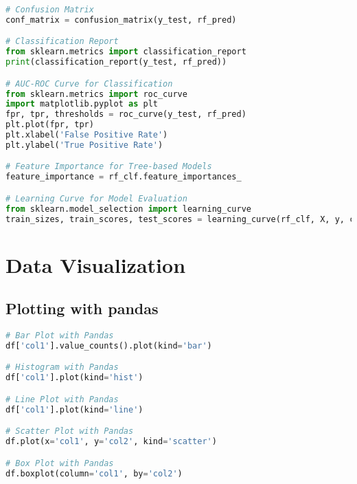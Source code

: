 \documentclass[english, threecolumn]{latex4ei/latex4ei_sheet}
\begin{document}
\begin{sectionbox}
\begin{lstlisting}[language=Python, gobble=0]
# Confusion Matrix
conf_matrix = confusion_matrix(y_test, rf_pred)

# Classification Report
from sklearn.metrics import classification_report
print(classification_report(y_test, rf_pred))

# AUC-ROC Curve for Classification
from sklearn.metrics import roc_curve
import matplotlib.pyplot as plt
fpr, tpr, thresholds = roc_curve(y_test, rf_pred)
plt.plot(fpr, tpr)
plt.xlabel('False Positive Rate')
plt.ylabel('True Positive Rate')

# Feature Importance for Tree-based Models
feature_importance = rf_clf.feature_importances_

# Learning Curve for Model Evaluation
from sklearn.model_selection import learning_curve
train_sizes, train_scores, test_scores = learning_curve(rf_clf, X, y, cv=5)
\end{lstlisting}
\end{sectionbox}

\section{Data Visualization}
\begin{sectionbox}
\subsection{Plotting with pandas}
\begin{lstlisting}[language=Python, gobble=0]
# Bar Plot with Pandas
df['col1'].value_counts().plot(kind='bar')

# Histogram with Pandas
df['col1'].plot(kind='hist')

# Line Plot with Pandas
df['col1'].plot(kind='line')

# Scatter Plot with Pandas
df.plot(x='col1', y='col2', kind='scatter')

# Box Plot with Pandas
df.boxplot(column='col1', by='col2')
\end{lstlisting}
\end{sectionbox}
\end{document}
